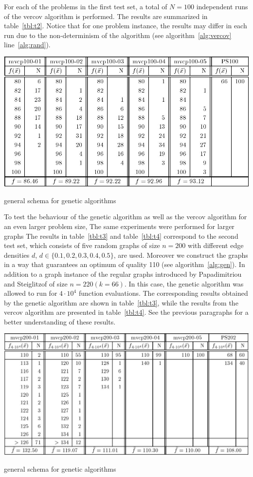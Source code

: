 \documentclass[12pt]{article}
\begin{document}
For each of the problems in the first test set, a total of $N=100$
independent runs of the vercov algorithm is performed. The results are summarized in table~\ref{tbl:t2}.
Notice that for one problem instance, the results may differ in each run due to the
non-determinism of the algorithm (see algorithm~\ref{alg:vercov} line~\ref{alg:rand}).

\begin{table}[!htbp]
\centering
\includegraphics[width=1\textwidth]{t2}
\caption{general schema for genetic algorithms}
\label{tbl:t2}
\end{table}

To test the behaviour of the genetic algorithm
as well as the vercov algorithm for an even
larger problem size, The same experiments were performed for larger graphs
The results in table~\ref{tbl:t3}
and table~\ref{tbl:t4} correspond to the second test set, which consists of
five random graphs of size $n = 200$ with different
edge densities $d$, $d \in \{0.1, 0.2, 0.3, 0.4, 0.5\}$, are used.
Moreover we construct the graphs in a way that guarantees an optimum of quality 110
(see algorithm~\ref{alg:gen}).
In addition to a graph instance of the regular graphs introduced by
Papadimitriou and Steiglitzof of size $n = 220 (k=66)$.
In this case, the genetic algorithm
was allowed to run for $4 \cdot 10^4$ function evaluations.
The corresponding results obtained by the
genetic algorithm are shown in table~\ref{tbl:t3}, while the results
from the vercov algorithm are presented in table~\ref{tbl:t4}.
See the previous paragraphs for a better understanding of these results.

\begin{table}[!htbp]
\centering
\includegraphics[width=1\textwidth]{t3}
\caption{general schema for genetic algorithms}
\label{tbl:t3}
\end{table}
\end{document}
